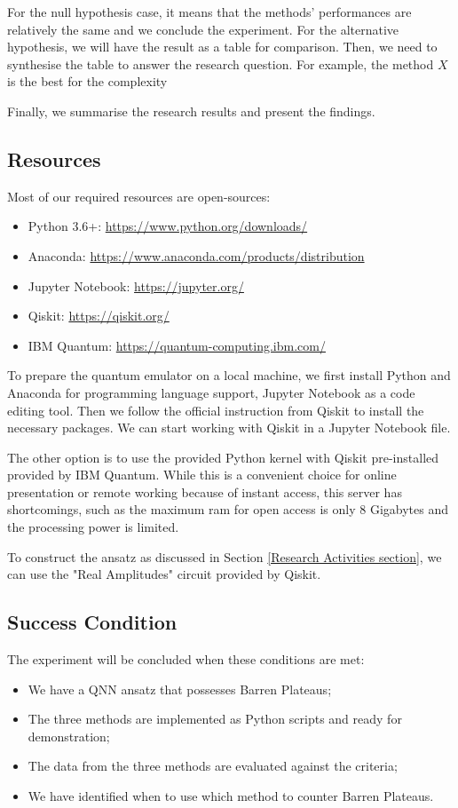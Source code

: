 For the null hypothesis case, it means that the methods' performances are relatively the same and we conclude the experiment.
For the alternative hypothesis, we will have the result as a table for comparison. 
Then, we need to synthesise the table to answer the research question. 
For example, the method $X$ is the best for the complexity

Finally, we summarise the research results and present the findings.

\subsection{Resources}
Most of our required resources are open-sources:
\begin{itemize}
    \item Python 3.6+: \url{https://www.python.org/downloads/}
    \item Anaconda: \url{https://www.anaconda.com/products/distribution}
    \item Jupyter Notebook: \url{https://jupyter.org/}
    \item Qiskit: \url{https://qiskit.org/}
    \item IBM Quantum: \url{https://quantum-computing.ibm.com/}
\end{itemize}

To prepare the quantum emulator on a local machine, we first install Python and Anaconda for programming language support, Jupyter Notebook as a code editing tool.
Then we follow the official instruction from Qiskit \cite{Qiskit} to install the necessary packages.
We can start working with Qiskit in a Jupyter Notebook file.

The other option is to use the provided Python kernel with Qiskit pre-installed provided by IBM Quantum. 
While this is a convenient choice for online presentation or remote working because of instant access, this server has shortcomings, such as the maximum ram for open access is only 8 Gigabytes and the processing power is limited.

To construct the ansatz as discussed in Section \ref{Research Activities section}, we can use the "Real Amplitudes" circuit provided by Qiskit.


\subsection{Success Condition}
The experiment will be concluded when these conditions are met:
\begin{itemize}
    \item We have a QNN ansatz that possesses Barren Plateaus;
    \item The three methods are implemented as Python scripts and ready for demonstration;
    \item The data from the three methods are evaluated against the criteria;
    \item We have identified when to use which method to counter Barren Plateaus.
\end{itemize}